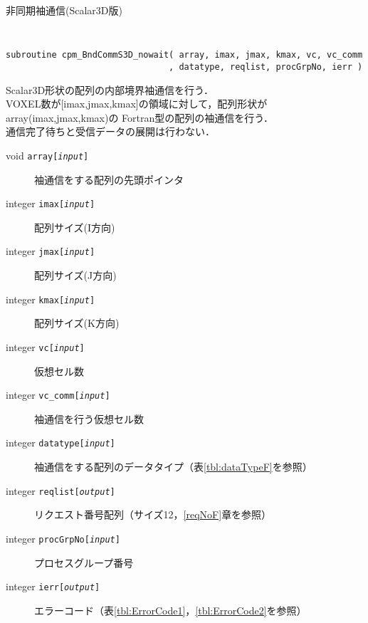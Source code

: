 \begin{spacing}{0.8}
\begin{itembox}[l]{非同期袖通信(Scalar3D版)}
{\tt
\begin{verbatim}
subroutine cpm_BndCommS3D_nowait( array, imax, jmax, kmax, vc, vc_comm
                                , datatype, reqlist, procGrpNo, ierr )
\end{verbatim}
}
Scalar3D形状の配列の内部境界袖通信を行う．\\
VOXEL数が[imax,jmax,kmax]の領域に対して，配列形状がarray(imax,jmax,kmax)の
Fortran型の配列の袖通信を行う．\\
通信完了待ちと受信データの展開は行わない．
\begin{description}
\item[void    {\tt array[{\it input}]}] 袖通信をする配列の先頭ポインタ
\item[integer {\tt imax[{\it input}]}] 配列サイズ(I方向)
\item[integer {\tt jmax[{\it input}]}] 配列サイズ(J方向)
\item[integer {\tt kmax[{\it input}]}] 配列サイズ(K方向)
\item[integer {\tt vc[{\it input}]}] 仮想セル数
\item[integer {\tt vc\_comm[{\it input}]}] 袖通信を行う仮想セル数
\item[integer {\tt datatype[{\it input}]}] 袖通信をする配列のデータタイプ（表\ref{tbl:dataTypeF}を参照）
\item[integer {\tt reqlist[{\it output}]}] リクエスト番号配列（サイズ12，\ref{reqNoF}章を参照）
\item[integer {\tt procGrpNo[{\it input}]}] プロセスグループ番号
\item[integer {\tt ierr[{\it output}]}] エラーコード（表\ref{tbl:ErrorCode1}，\ref{tbl:ErrorCode2}を参照）
\end{description}
\end{itembox}\\
\end{spacing}

